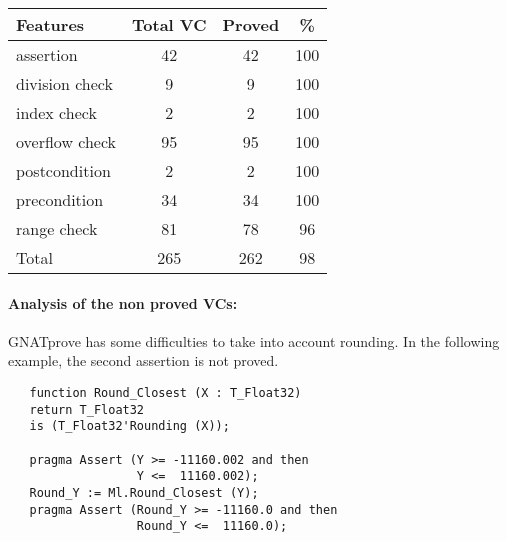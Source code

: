 \documentclass[10pt,a4paper,twocolumn]{article}
\newcommand{\gnatprove}{GNATprove\xspace}
\begin{document}
\begin{tabular}{|l|c|c|c|}
\hline
Features       & Total VC & Proved & \%  \\ %
\hline
assertion      & 42       & 42     & 100 \\ %
\hline
division check & 9        & 9      & 100 \\ %
\hline
index check    & 2        & 2      & 100 \\ %
\hline
overflow check & 95       & 95     & 100 \\ %
\hline
postcondition  & 2        & 2      & 100 \\ %
\hline
precondition   & 34       & 34     & 100 \\ %
\hline
range check    & 81       & 78     & 96  \\ %
\hline
Total          & 265      & 262    & 98  \\ %
\hline
\end{tabular}


\paragraph{Analysis of the non proved VCs:}
\gnatprove has some difficulties to take into account rounding.
In the following example, the second assertion is not proved.

\begin{lstlisting}
   function Round_Closest (X : T_Float32)
   return T_Float32
   is (T_Float32'Rounding (X));

   pragma Assert (Y >= -11160.002 and then
                  Y <=  11160.002);
   Round_Y := Ml.Round_Closest (Y);
   pragma Assert (Round_Y >= -11160.0 and then
                  Round_Y <=  11160.0);
\end{lstlisting}
\end{document}
